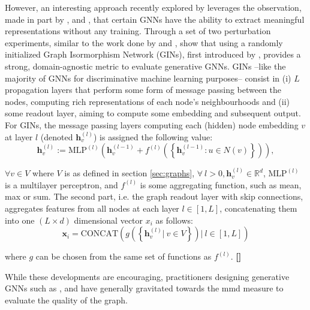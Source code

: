 However, an interesting approach recently explored by
\cite{thompson2022evaluation} leverages the observation, made in part by
\cite{xu2018powerful,morris2019weisfeiler}, and \cite{kipf2016semi}, that
certain GNNs have the ability to extract meaningful
representations without any training. Through a set of two perturbation
experiments, similar to the work done by \cite{xu2018empirical} and
\cite{o2021evaluation}, \cite{thompson2022evaluation} show that using a
randomly initialized Graph Isormorphism Network (GINs), first introduced by
\cite{xu2018powerful}, provides a strong, domain-agnostic metric to evaluate
generative GNNs. GINs --like the majority of GNNs for discriminative machine
learning purposes-- consist in (i) $L$ propagation layers that perform some form
of message passing between the nodes, computing rich representations of each
node's neighbourhoods and (ii) some readout layer, aiming to compute some
embedding and subsequent output. For GINs, the message passing layers computing
each (hidden) node embedding $v$ at layer $l$ (denoted $\mathbf{h}_{v}^{(l)}$)
is assigned the following value:
\begin{equation}
  \label{eq:mplgin}
  \mathbf{h}_{v}^{(l)}:=\text{MLP}^{(l)}\left(\mathbf{h}_{v}^{(l-1)} +
f^{(l)}\left(\left\{ \mathbf{h}_{v}^{(l-1)}: u\in N(v)\right\}\right)\right),
\end{equation}

$\forall v\in V$ where $V$ is as defined in section \ref{sec:graphs},
$\forall\ l>0, \mathbf{h}_{v}^{(l)}\in\mathbb{R}^d$, $\text{MLP}^{(l)}$ is a
multilayer perceptron, and $f^{(l)}$ is some aggregating function, such as mean,
max or sum. The second part, i.e. the graph readout layer with skip connections,
aggregates features from all nodes at each layer $l\in [1,L]$, concatenating
them into one $(L\times d)$ dimensional vector $x_i$ as follows:
\begin{equation}
  \label{eq:readout_gin}
  \mathbf{x}_i = \text{CONCAT}\left(  g\left( \left\{ \mathbf{h}_{v}^{(l)} |\ v\in V \right\} \right) |\ l \in [1, L] \right)
\end{equation}

where $g$ can be chosen from the same set of functions as $f^{(l)}$. \textbf{[]}

While these developments are encouraging, practitioners designing generative
GNNs such as \cite{liao2019efficient, niu2020permutation}, and
\cite{you2018graphrnn} have generally gravitated towards the \acrfull{mmd} measure to evaluate the quality of the graph.

